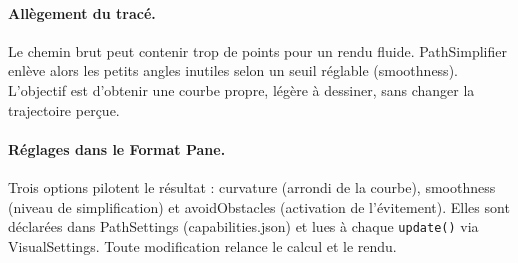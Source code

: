 \paragraph{Allègement du tracé.}
Le chemin brut peut contenir trop de points pour un rendu fluide. PathSimplifier enlève alors les petits angles inutiles selon un seuil réglable (smoothness). L’objectif est d’obtenir une courbe propre, légère à dessiner, sans changer la trajectoire perçue.

\paragraph{Réglages dans le Format Pane.}
Trois options pilotent le résultat : curvature (arrondi de la courbe), smoothness (niveau de simplification) et avoidObstacles (activation de l’évitement). Elles sont déclarées dans PathSettings (capabilities.json) et lues à chaque \verb|update()| via VisualSettings. Toute modification relance le calcul et le rendu.
